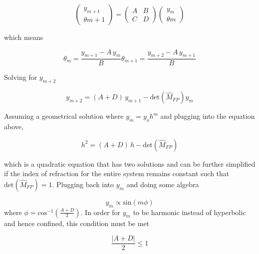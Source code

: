 \documentclass[oneside]{book}
\begin{document}
\begin{appendices}
	\begin{equation}
	\begin{pmatrix} y_{m+1} 
	\\ \theta{m+1}
	\end{pmatrix}
	= 
	\begin{pmatrix}
		A	&B		
	\\ 	C	&D
	\end{pmatrix}
	\begin{pmatrix} y_{m} 
	\\ \theta{m}
	\end{pmatrix}
	\end{equation}
	
	which means
	
	\begin{subequations}
	\begin{equation}
	\theta_m = \frac{y_{m+1} - A \, y_m}{B}
	\end{equation}
	\begin{equation}
	\theta_{m+1} = \frac{y_{m+2} - A \, y_{m+1}}{B}
	\end{equation}
	\end{subequations}

	Solving for $y_{m+2}$
	
	\begin{equation}
	y_{m+2} = (A+D) \, y_{m+1} - \text{det}(\hat{M}_{FP}) y_m
	\end{equation}
	
	Assuming a geometrical solution where $y_m = y_o h^m$ and plugging into the equation above, 
	
	\begin{equation}
	h^2 = (A+D) \, h - \text{det}(\hat{M}_{FP})
	\end{equation}
	
	which is a quadratic equation that has two solutions and can be further simplified if the index of refraction for the entire system remains constant such that $\text{det}(\hat{M}_{FP}) =1 $.  Plugging back into $y_m$ and doing some algebra
	
	\begin{equation}
	y_m \propto \text{sin}(m \phi )
	\end{equation}
	where $\phi =\text{cos}^{-1} (\frac{A+D}{2})$.  In order for $y_m$ to be harmonic instead of hyperbolic and hence confined, this condition must be met
	
	\begin{equation}
	\frac{\vert A+D \vert}{2} \leq 1
	\end{equation}
	

\end{appendices}
\end{document}
